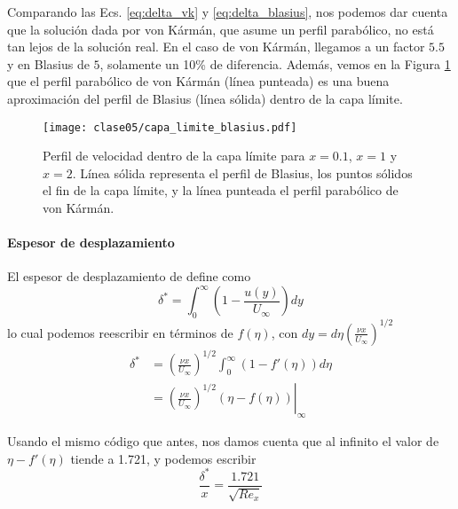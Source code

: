 Comparando las Ecs. \eqref{eq:delta_vk} y \eqref{eq:delta_blasius}, nos podemos dar cuenta que la solución dada por von Kármán, que asume un perfil parabólico, no está tan lejos de la solución real.
En el caso de von Kármán, llegamos a un factor $5.5$ y en Blasius de $5$, solamente un 10\% de diferencia.
Además, vemos en la Figura \ref{fig:capa_limite_blasius} que el perfil parabólico de von Kármán (línea punteada) es una buena aproximación del perfil de Blasius (línea sólida) dentro de la capa límite.
%
\begin{figure}
\centering
\texttt{[image: clase05/capa\_limite\_blasius.pdf]}
\caption{Perfil de velocidad dentro de la capa límite para $x=0.1$, $x=1$ y $x=2$. Línea sólida representa el perfil de Blasius, los puntos sólidos el fin de la capa límite, y la línea punteada el perfil parabólico de von Kármán.}
\label{fig:capa_limite_blasius}
\end{figure}

\paragraph*{Espesor de desplazamiento}

El espesor de desplazamiento de define como 
%
\begin{equation}
\delta^* = \int_0^\infty\left(1-\frac{u(y)}{U_\infty}\right)dy
\end{equation}
%
lo cual podemos reescribir en términos de $f(\eta)$, con $dy = d\eta\left(\frac{\nu x}{U_\infty}\right)^{1/2}$
%
\begin{align}
\delta^* &= \left(\frac{\nu x}{U_\infty}\right)^{1/2}\int_0^\infty(1-f'(\eta))d\eta\\
& = \left.\left(\frac{\nu x}{U_\infty}\right)^{1/2} (\eta-f(\eta))\right|_\infty
\end{align}

Usando el mismo código que antes, nos damos cuenta que al infinito el valor de $\eta-f'(\eta)$ tiende a 1.721, y podemos escribir
%
\begin{equation}
\frac{\delta^*}{x} = \frac{1.721}{\sqrt{Re_x}}
\end{equation}

